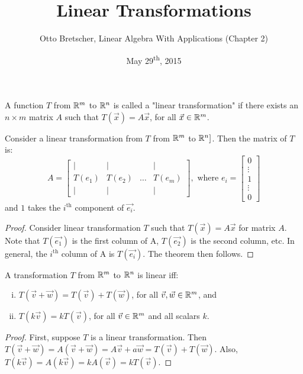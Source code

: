 \documentclass[a4paper,11pt]{article}
\title{Linear Transformations}
\author{Otto Bretscher, Linear Algebra With Applications (Chapter 2)}
\date{May 29\textsuperscript{th}, 2015}
\begin{document}
\maketitle
{}

\begin{outline}

    A function \(T\) from \(\mathbb{R}^m\) to \(\mathbb{R}^n\) is called a "linear transformation" if there exists 
    an \(n \times m\) matrix \(A\) such that \(T(\vec{x}) = A\vec{x}\), for all \(\vec{x} \in \mathbb{R}^m\).
    
    Consider a linear transformation from \(T\) from \(\mathbb{R}^m\) to \(\mathbb{R}^n]\). Then the matrix of \(T\) is:
    \[
      A = 
        \begin{bmatrix} 
          \vert  & \vert  &        & \vert  \\
          T(e_1) & T(e_2) & \ldots & T(e_m) \\
          \vert  & \vert  &        & \vert
        \end{bmatrix}
      ,\text{ where } e_{i} = \begin{bmatrix} 0 \\ \vdots \\ 1 \\ \vdots \\ 0 \end{bmatrix}
    \]
    and \(1\) takes the \(i^{\text{th}}\) component of \(\vec{e_i}\).
    
    \begin{proof}
      Consider linear transformation \(T\) such that \(T(\vec{x}) = A\vec{x}\) for matrix \(A\). Note that
      \(T(\vec{e_1})\) is the first column of A, \(T(\vec{e_2})\) is the second column, etc. In general, the
      \(i^{\text{th}}\) column of A is \(T(\vec{e_i})\). The theorem then follows.
    \end{proof}
    
    A transformation \(T\) from \(\mathbb{R}^m\) to \(\mathbb{R}^n\) is linear iff:
    \begin{enumerate}[i.]
      \item \(T(\vec{v} + \vec{w}) = T(\vec{v}) + T(\vec{w})\), for all \(\vec{v}, \vec{w} \in \mathbb{R}^m\), and
      \item \(T(k\vec{v}) = kT(\vec{v})\), for all \(\vec{v} \in \mathbb{R}^m\) and all scalars \(k\).
    \end{enumerate}
    
    \begin{proof}
      \forward
        First, suppose \(T\) is a linear transformation. Then \(T(\vec{v} + \vec{w}) = A(\vec{v} + \vec{w})
        = A\vec{v} + a\vec{w} = T(\vec{v}) + T(\vec{w})\). Also, \(T(k\vec{v}) = A(k\vec{v}) = kA(\vec{v}) 
        = kT(\vec{v})\).
        

\end{proof}
\end{outline}
\end{document}
